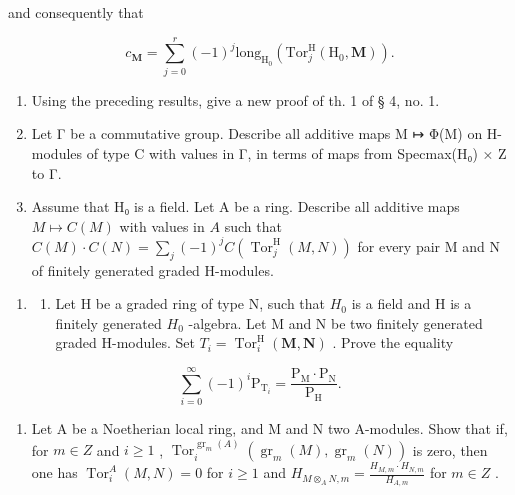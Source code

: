 and consequently that

\[
c _ {\mathbf {M}} = \sum_ {j = 0} ^ {r} (- 1) ^ {j} \mathrm{long} _ {\mathrm{H} _ {0}} (\mathrm{Tor} _ {j} ^ {\mathrm{H}} (\mathrm{H} _ {0}, \mathbf {M})).
\]

\begin{enumerate}
\def\labelenumi{\alph{enumi})}
\setcounter{enumi}{6}
\tightlist
\item
  Using the preceding results, give a new proof of th. 1 of § 4, no. 1.
\item
  Let Γ be a commutative group. Describe all additive maps M ↦ Φ(M) on H-modules of type C with values in Γ, in terms of maps from Specmax(H₀) × Z to Γ.
\item
  Assume that H₀ is a field. Let A be a ring. Describe all additive maps \(M\mapsto C(M)\) with values in \(A\) such that \(C(M)\cdot C(N) = \sum_j(-1)^j C(\operatorname{Tor}_{j}^{\mathrm{H}}(M,N))\) for every pair M and N of finitely generated graded H-modules.
\end{enumerate}

\begin{enumerate}
\def\labelenumi{\arabic{enumi})}
\setcounter{enumi}{4}
\tightlist
\item
  \begin{enumerate}
  \def\labelenumii{\alph{enumii})}
  \tightlist
  \item
    Let H be a graded ring of type N, such that \(H_{0}\) is a field and H is a finitely generated \(H_{0}\) -algebra. Let M and N be two finitely generated graded H-modules. Set \(T_{i} = \operatorname{Tor}_{i}^{\mathrm{H}}(\mathbf{M}, \mathbf{N})\) . Prove the equality
  \end{enumerate}
\end{enumerate}

\[
\sum_ {i = 0} ^ {\infty} (- 1) ^ {i} \mathrm{P} _ {\mathrm{T} _ {i}} = \frac {\mathrm{P} _ {\mathrm{M}} \cdot \mathrm{P} _ {\mathrm{N}}}{\mathrm{P} _ {\mathrm{H}}}.
\]

\begin{enumerate}
\def\labelenumi{\alph{enumi})}
\setcounter{enumi}{1}
\tightlist
\item
  Let A be a Noetherian local ring, and M and N two A-modules. Show that if, for \(m \in Z\) and \(i \geqslant 1\) , \(\operatorname{Tor}_{i}^{\operatorname{gr}_{m}(A)}(\operatorname{gr}_{m}(M), \operatorname{gr}_{m}(N))\) is zero, then one has \(\operatorname{Tor}_{i}^{A}(M, N) = 0\) for \(i \geqslant 1\) and \(H_{M \otimes_{A} N, m} = \frac{H_{M, m} \cdot H_{N, m}}{H_{A, m}}\) for \(m \in Z\) .
\end{enumerate}

